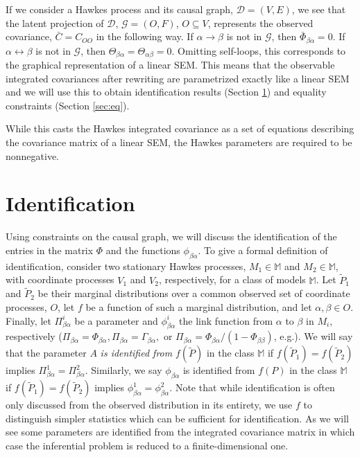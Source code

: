 \documentclass[accepted]{uai2021} %
\begin{document}
If we consider a Hawkes process and its causal graph, $\mathcal{D} = (V,E)$, we 
see that the latent projection of $\mathcal{D}$, $\mathcal{G} = (O,F)$, 
$O\subseteq V$, represents the observed covariance, $\bar{C} = C_{OO}$ in the 
following way. If $\alpha\rightarrow\beta$ is not in $\mathcal{G}$, then 
$\bar{\Phi}_{\beta\alpha}=0$. If $\alpha\leftrightarrow\beta$ is not in 
$\mathcal{G}$, then $\Theta_{\beta\alpha} = \Theta_{\alpha\beta} = 0$. Omitting 
self-loops, this corresponds to the graphical representation of a linear SEM. 
This means that the observable integrated covariances after rewriting are 
parametrized exactly like a linear SEM and we will use this to obtain 
identification results (Section \ref{sec:id}) and equality constraints (Section 
\ref{sec:eq}).

While 
this 
casts the Hawkes integrated covariance as a set of equations describing the 
covariance 
matrix of a linear SEM, the Hawkes parameters are required to be nonnegative. 
	


\section{Identification}
\label{sec:id}

Using constraints on the causal graph, we will discuss the identification of 
the entries in the 
matrix $\Phi$ and the functions $\phi_{\beta\alpha}$. To give a formal 
definition 
of 
identification, consider two stationary Hawkes 
processes, $M_1\in\mathbb{M}$ and $M_2\in\mathbb{M}$, with coordinate processes 
$V_1$ and $V_2$, 
respectively, for a class of models $\mathbb{M}$. Let $ \tilde{P}_1$ and $ 
\tilde{P}_2$ be their marginal 
distributions over a common observed set of 
coordinate processes, $O$, let $f$ be a function of 
such a marginal distribution, and let 
$\alpha,\beta\in O$. Finally, let $\Pi_{\beta\alpha}^i$ be a parameter and 
$\phi_{\beta\alpha}^i$ the link function from $\alpha$ to 
$\beta$ in $M_i$, respectively ($\Pi_{\beta\alpha} = \Phi_{\beta\alpha}, 
\Pi_{\beta\alpha}=\Gamma_{\beta\alpha},$ or $\Pi_{\beta\alpha} = 
\Phi_{\beta\alpha}/(1-\Phi_{\beta\beta})$, e.g.). We will say that the 
parameter 
$A$ \emph{is 
identified from} 
$f(\tilde{P})$ in the class $\mathbb{M}$ if $f(\tilde{P}_1) = f(\tilde{P}_2)$ 
implies $\Pi_{\beta\alpha}^1 = 
\Pi_{\beta\alpha}^2$. Similarly, we say 
$\phi_{\beta\alpha}$ is identified from $f(P)$ in the class $\mathbb{M}$ if 
$f(\tilde{P}_1) = 
f(\tilde{P}_2)$ 
implies $\phi_{\beta\alpha}^1 = \phi_{\beta\alpha}^2$. Note that while 
identification 
is often only discussed from the 
observed distribution in its entirety, we use $f$ to distinguish simpler 
statistics which can be sufficient for identification. As we will see some 
parameters are identified from the integrated covariance matrix in which case 
the inferential problem is reduced to a finite-dimensional one.
\end{document}
